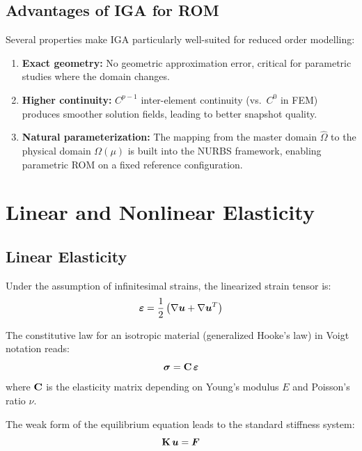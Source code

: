 \subsection{Advantages of IGA for ROM}

Several properties make IGA particularly well-suited for reduced order modelling:
\begin{enumerate}
    \item \textbf{Exact geometry:} No geometric approximation error, critical for parametric studies where the domain changes.
    \item \textbf{Higher continuity:} $C^{p-1}$ inter-element continuity (vs.\ $C^0$ in FEM) produces smoother solution fields, leading to better snapshot quality.
    \item \textbf{Natural parameterization:} The mapping from the master domain $\hat{\Omega}$ to the physical domain $\Omega(\mu)$ is built into the NURBS framework, enabling parametric ROM on a fixed reference configuration.
\end{enumerate}

\section{Linear and Nonlinear Elasticity}
\label{sec:elasticity}

\subsection{Linear Elasticity}

Under the assumption of infinitesimal strains, the linearized strain tensor is:
\begin{equation}
    \bm{\varepsilon} = \frac{1}{2}\left(\nabla\bm{u} + \nabla\bm{u}^T\right)
\end{equation}

The constitutive law for an isotropic material (generalized Hooke's law) in Voigt notation reads:
\begin{equation}
    \bm{\sigma} = \mathbf{C} \, \bm{\varepsilon}
\end{equation}
where $\mathbf{C}$ is the elasticity matrix depending on Young's modulus $E$ and Poisson's ratio $\nu$.

The weak form of the equilibrium equation leads to the standard stiffness system:
\begin{equation}
    \mathbf{K} \, \bm{u} = \bm{F}
    \label{eq:linear-system}
\end{equation}

